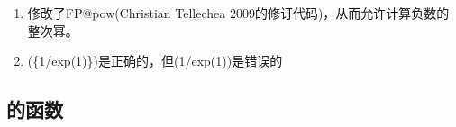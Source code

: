 \documentclass[../main.tex]{subfiles}
\begin{document}
\begin{enumerate}
 \item {}修改了FP@pow(Christian Tellechea 2009的修订代码)，从而允许计算负数的整次幂。


\item (\{1/exp(1)\})是正确的，但(1/exp(1))是错误的
\end{enumerate}

\subsection{的函数}
\end{document}
